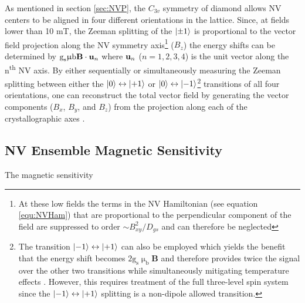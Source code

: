 As mentioned in section \ref{sec:NVP}, the $C_{3v}$ symmetry of diamond allows NV centers to be aligned in four different orientations in the lattice. Since, at fields lower than 10 mT, the Zeeman splitting of the $\ket{\pm 1}$ is proportional to the vector field projection along the NV symmetry axis\footnote{At these low fields the terms in the NV Hamiltonian (see equation \ref{equ:NVHam}) that are proportional to the perpendicular component of the field are suppressed to order $\sim B_{xy}^2 / D_{gs}$ and can therefore be neglected\cite{taylor2008high}} ($B_z$) the energy shifts can be determined by $\text{g}_\text{s} \upmu \text{b}\textbf{B} \cdot \textbf{\text{u}}_n$ where $\textbf{\text{u}}_n$ ($n = 1,2,3,4$) is the unit vector along the n\textsuperscript{th} NV axis. By either sequentially or simultaneously measuring the Zeeman splitting between either the $\ket{0} \leftrightarrow \ket{+1}$ or $\ket{0} \leftrightarrow \ket{-1}$\footnote{The transition $\ket{-1} \leftrightarrow \ket{+1}$ can also be employed which yields the benefit that the energy shift becomes $2\text{g}_\text{s}\upmu_\text{b}\textbf{B}$ and therefore provides twice the signal over the other two transitions while simultaneously mitigating temperature effects \cite{neumann2013high}. However, this requires treatment of the full three-level spin system since the $\ket{-1} \leftrightarrow \ket{+1}$ splitting is a non-dipole allowed transition.} transitions of all four orientations, one can reconstruct the total vector field by generating the vector components ($B_x$, $B_y$, and $B_z$) from the projection along each of the crystallographic axes \cite{kitazawa2017vector,schloss2018simultaneous}.

\subsection{NV Ensemble Magnetic Sensitivity}

The magnetic sensitivity





